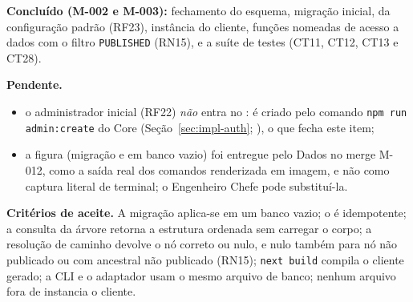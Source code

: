 \textbf{Concluído (M-002 e M-003):} fechamento do esquema, migração inicial,  da configuração padrão (RF23), instância do cliente, funções nomeadas de acesso a dados com o filtro \texttt{PUBLISHED} (RN15),  e a suíte de testes (CT11, CT12, CT13 e CT28).

\textbf{Pendente.}
\begin{itemize}
  \item o administrador inicial (RF22) \emph{não} entra no : é criado pelo comando \texttt{npm run admin:create} do Core (Seção~\ref{sec:impl-auth}; ), o que fecha este item;
  \item a figura  (migração e  em banco vazio) foi entregue pelo Dados no merge M-012, como a saída real dos comandos renderizada em imagem, e não como captura literal de terminal; o Engenheiro Chefe pode substituí-la.
\end{itemize}

\textbf{Critérios de aceite.} A migração aplica-se em um banco vazio; o  é idempotente; a consulta da árvore retorna a estrutura ordenada sem carregar o corpo; a resolução de caminho devolve o nó correto ou nulo, e nulo também para nó não publicado ou com ancestral não publicado (RN15); \texttt{next build} compila o cliente gerado; a CLI e o adaptador usam o mesmo arquivo de banco; nenhum arquivo fora de  instancia o cliente.




